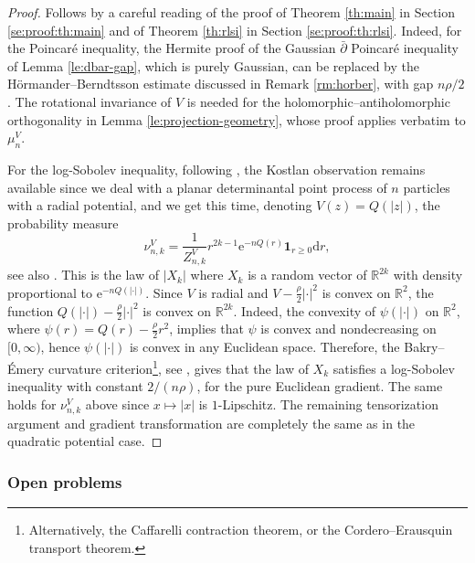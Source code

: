 \documentclass[11pt,reqno]{amsart}
\numberwithin{equation}{section}%
\numberwithin{figure}{section}%
\numberwithin{table}{section}
\theoremstyle{plain}
\theoremstyle{definition}
\begin{document}
\begin{proof}
  Follows by a careful reading of the proof of Theorem \ref{th:main} in
  Section \ref{se:proof:th:main} and of Theorem \ref{th:rlsi} in Section
  \ref{se:proof:th:rlsi}. Indeed, for the Poincaré inequality, the Hermite
  proof of the Gaussian $\bar\partial$ Poincaré inequality of Lemma
  \ref{le:dbar-gap}, which is purely Gaussian, can be replaced by the
  Hörmander--Berndtsson estimate discussed in Remark \ref{rm:horber}, with gap
  $n\rho/2$. The rotational invariance of $V$ is needed for the
  holomorphic--antiholomorphic orthogonality in Lemma
  \ref{le:projection-geometry}, whose proof applies verbatim to $\mu_n^V$.

  For the log-Sobolev inequality, following
  \cite[Th.~26]{HoughKrishnapurPeresViragIndependence}, the Kostlan
  observation remains available since we deal with a planar determinantal
  point process of $n$ particles with a radial potential, and we get this
  time,
  denoting $V(z)=Q(|z|)$, the probability measure
  \begin{equation}
    \nu^V_{n,k}=\frac{1}{Z^V_{n,k}}r^{2k-1}
    \mathrm{e}^{-nQ(r)}\mathbf{1}_{r\geq0}\mathrm{d}r,
  \end{equation}
  see also \cite{zbMATH06347751}. This is the law of $|X_k|$ where $X_k$ is a
  random vector of $\mathbb{R}^{2k}$ with density proportional to
  $\mathrm{e}^{-nQ(\left|\cdot\right|)}$. Since $V$ is radial and
  $V-\frac{\rho}{2}\left|\cdot\right|^2$ is convex on $\mathbb{R}^2$, the
  function $Q(\left|\cdot\right|)-\frac{\rho}{2}\left|\cdot\right|^2$ is
  convex on $\mathbb{R}^{2k}$. Indeed, the convexity of
  $\psi(\left|\cdot\right|)$ on $\mathbb{R}^2$, where
  $\psi(r)=Q(r)-\frac{\rho}{2}r^2$, implies that $\psi$ is convex and
  nondecreasing on $[0,\infty)$, hence $\psi(\left|\cdot\right|)$ is convex in
  any Euclidean space. Therefore, the Bakry--Émery curvature
  criterion\footnote{Alternatively, the Caffarelli contraction theorem, or the
    Cordero--Erausquin transport theorem.}, see \cite{BakryGentilLedoux},
  gives that the law of $X_k$ satisfies a log-Sobolev inequality with constant
  $2/(n\rho)$, for the pure Euclidean gradient. The same holds for $\nu^V_{n,k}$
  above since $x\mapsto|x|$ is $1$-Lipschitz. The remaining tensorization
  argument and gradient transformation are completely the same as in the
  quadratic potential case.
\end{proof}

\subsubsection{Open problems}
\end{document}
